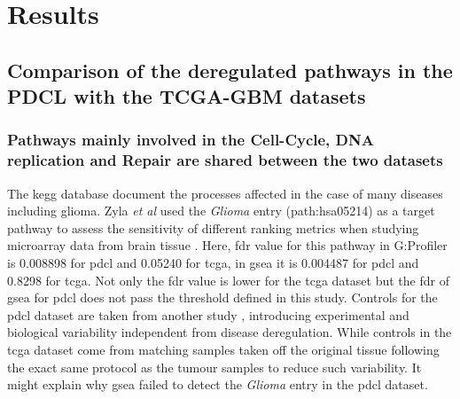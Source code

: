 \section{Results}

\subsection{Comparison of the deregulated pathways in the PDCL with the TCGA-GBM datasets}

\subsubsection{Pathways mainly involved in the Cell-Cycle, DNA replication and Repair are shared between the two datasets}

The \acrshort{kegg} database document the processes affected in the case of many diseases including glioma.
Zyla \textit{et al} used the \textit{Glioma} entry (path:hsa05214) as a target pathway to assess the sensitivity of different ranking metrics when studying microarray data from brain tissue \cite*{Zyla2017}.
Here, \acrshort{fdr} value for this pathway in G:Profiler is 0.008898 for \acrshort{pdcl} and 0.05240 for \acrshort{tcga}, in \acrshort{gsea} it is 0.004487 for \acrshort{pdcl} and 0.8298 for \acrshort{tcga}.
Not only the \acrshort{fdr} value is lower for the \acrshort{tcga} dataset but the \acrshort{fdr} of \acrshort{gsea} for \acrshort{pdcl} does not pass the threshold defined in this study.
Controls for the \acrshort{pdcl} dataset are taken from another study \cite*{Lundin2018}, introducing experimental and biological variability independent from disease deregulation.
While controls in the \acrshort{tcga} dataset come from matching samples taken off the original tissue following the exact same protocol as the tumour samples to reduce such variability.
It might explain why \acrshort{gsea} failed to detect the \textit{Glioma} entry in the \acrshort{pdcl} dataset.

